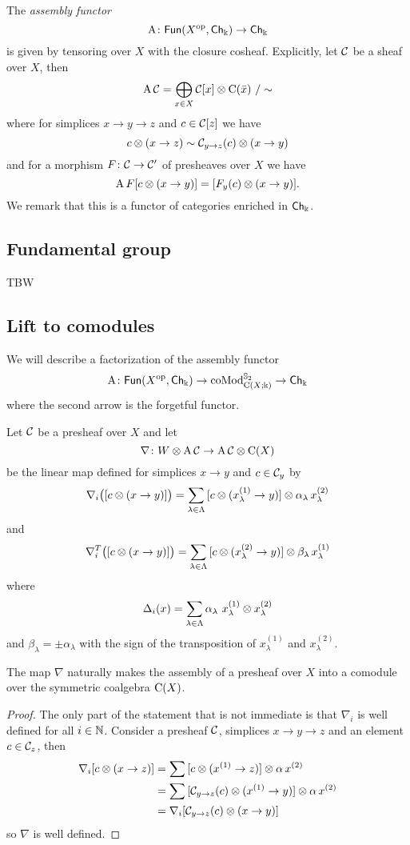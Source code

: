 The \textit{assembly functor}
\[
\operatorname{A} \colon \mathsf{Fun}(X^{\mathrm{op}}, \mathsf{Ch}_\Bbbk) \to \mathsf{Ch}_\Bbbk
\]
is given by tensoring over $X$ with the closure cosheaf.
Explicitly, let $\mathcal{C}$ be a sheaf over $X$, then
\[
\operatorname{A} \mathcal{C} = \bigoplus_{x \in X} \mathcal{C}[x] \otimes \operatorname{C}(\bar x) \ / \sim
\]
where for simplices $x \to y \to z$ and $c \in \mathcal{C}[z]$ we have
\[
c \otimes (x \to z) \sim \mathcal{C}_{y \to z}(c) \otimes (x \to y)
\]
and for a morphism $F \colon \mathcal{C} \to \mathcal{C}'$ of presheaves over $X$ we have
\[
\operatorname{A} F[c \otimes (x \to y)] = [F_y(c) \otimes (x \to y)].
\]
We remark that this is a functor of categories enriched in $\mathsf{Ch}_\Bbbk$.

\subsection{Fundamental group}

TBW

\subsection{Lift to comodules}

We will describe a factorization of the assembly functor
\[
\operatorname{A} \colon \mathsf{Fun}(X^{\mathrm{op}}, \mathsf{Ch}_\Bbbk) \to \operatorname{coMod}^{\mathbb{S}_2}_{\operatorname{C}(X;\Bbbk)} \to \mathsf{Ch}_{\Bbbk}
\]
where the second arrow is the forgetful functor.

Let $\mathcal{C}$ be a presheaf over $X$ and let
\[
\nabla \colon W \otimes \operatorname{A} \mathcal{C} \to \operatorname{A} \mathcal{C} \otimes \operatorname{C}(X)
\]
be the linear map defined for simplices $x \to y$ and $c \in \mathcal{C}_y$ by
\[
\nabla_i \big( [c \otimes (x \to y)] \big) =
\sum_{\lambda \in \Lambda} {[c \otimes (x_\lambda^{(1)} \to y)]} \otimes \alpha_\lambda \, x_\lambda^{(2)}
\]
and
\[
\nabla_i^T \big( [c \otimes (x \to y)] \big) =
\sum_{\lambda \in \Lambda} {[c \otimes (x_\lambda^{(2)} \to y)]} \otimes \beta_\lambda \, x_\lambda^{(1)}
\]
where
\[
\Delta_i(x) = \sum_{\lambda \in \Lambda} \alpha_\lambda \ x_\lambda^{(1)} \otimes x_\lambda^{(2)}
\]
and
$\beta_\lambda = \pm \alpha_\lambda$ with the sign of the transposition of $x_\lambda^{(1)}$ and $x_\lambda^{(2)}$.

\begin{lemma*}
	The map $\nabla$ naturally makes the assembly of a presheaf over $X$ into a comodule over the symmetric coalgebra $\operatorname{C}(X)$.
\end{lemma*}

\begin{proof}
	The only part of the statement that is not immediate is that $\nabla_i$ is well defined for all $i \in \mathbb{N}$.
	Consider a presheaf $\mathcal{C}$, simplices $x \to y \to z$ and an element $c \in \mathcal{C}_z$, then
	\begin{align*}
		\nabla_i [c \otimes (x \to z)] &=
		\sum {[c \otimes(x^{(1)} \to z)]} \otimes \alpha \, x^{(2)} \\ &=
		\sum {[\mathcal{C}_{y \to z}(c) \otimes(x^{(1)} \to y)]} \otimes \alpha \, x^{(2)} \\ &=
		\nabla_i [\mathcal{C}_{y \to z}(c) \otimes (x \to y)]
	\end{align*}
	so $\nabla$ is well defined.
\end{proof}

